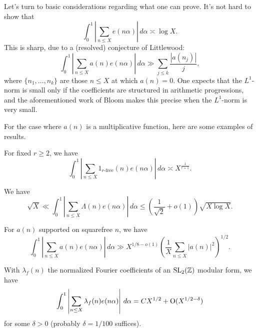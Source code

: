 \documentclass[reqno]{amsart} 
\begin{document}
Let's turn to basic considerations regarding what one can prove.  It's not hard to show that
\begin{equation*}
  \int_0^1 \left\lvert \sum_{n \leq X} e (n \alpha ) \right\rvert \, d \alpha
  \asymp \log X.  
\end{equation*}
This is sharp, due to a (resolved) conjecture of Littlewood:
\begin{equation*}
  \int_0^1 \left\lvert \sum_{n \leq X} a (n ) e (n \alpha ) \right\rvert \, d \alpha
  \gg
  \sum_{j \leq k}
  \frac{\left\lvert a (n_j ) \right\rvert}{j},
\end{equation*}
where $\{n_1, \dotsc, n_k\}$ are those $n \leq X$ at which $a (n) = 0$.  One expects that the $L^1$-norm is small only if the coefficients are structured in arithmetic progressions, and the aforementioned work of Bloom makes this precise when the $L^1$-norm is very small.

For the case where $a(n)$ is a multiplicative function, here are some examples of results.
\begin{theorem}
  For fixed $r \geq 2$, we have
  \begin{equation*}
    \int_0^1 \left\lvert \sum_{n \leq X} 1_{r\text{-free}}(n) e (n \alpha ) \right\rvert
    \, d \alpha \asymp X^{\frac{1}{r + 1}}.    
  \end{equation*}
\end{theorem}
\begin{theorem}
  We have
  \begin{equation*}
    \sqrt{X} \ll \int_0^1 \left\lvert \sum_{n \leq X} \Lambda (n ) e (n \alpha ) \right\rvert \, d \alpha
    \leq \left( \frac{1}{\sqrt{2}} + o(1) \right)
    \sqrt{X \log X}.
  \end{equation*}
\end{theorem}
\begin{theorem}
  For $a (n)$ supported on squarefree $n$, we have
  \begin{equation*}
    \int_0^1 \left\lvert \sum_{n \leq X } a (n ) e (n \alpha ) \right\rvert \, d \alpha
    \gg
    X^{1/ 8 - o(1)} \left( \frac{1}{X} \sum_{n \leq X } \lvert a (n )  \rvert^2  \right)^{1/2}.
  \end{equation*}
\end{theorem}

\begin{theorem}[P.]
  With $\lambda_f (n)$ the normalized Fourier coefficients of an $\operatorname{SL}_2(\mathbb{Z})$ modular form, we have
  \begin{equation*}
    \int_0^1 \left\lvert \sum_{n \leq X } \lambda_f (n ) e (n \alpha ) \right\rvert \, d \alpha
    = C X^{1/2} + \operatorname{O}(X^{1/2 - \delta })    
  \end{equation*}
  for some $\delta > 0$ (probably $\delta = 1/100$ suffices).
\end{theorem}
\end{document}
